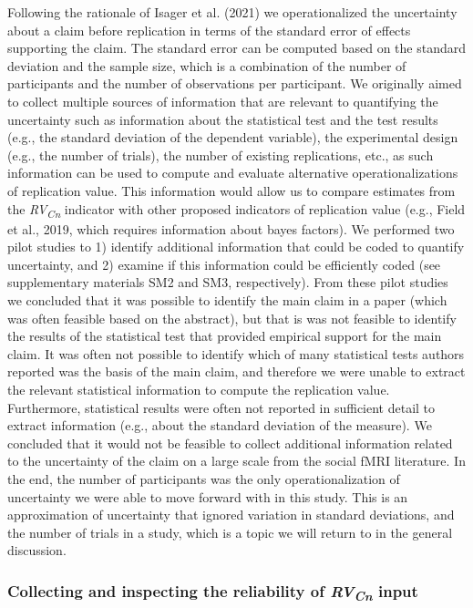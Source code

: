 \documentclass[
  man,floatsintext]{apa6}
\begin{document}
Following the rationale of Isager et al. (2021) we operationalized the uncertainty about a claim before replication in terms of the standard error of effects supporting the claim. The standard error can be computed based on the standard deviation and the sample size, which is a combination of the number of participants and the number of observations per participant. We originally aimed to collect multiple sources of information that are relevant to quantifying the uncertainty such as information about the statistical test and the test results (e.g., the standard deviation of the dependent variable), the experimental design (e.g., the number of trials), the number of existing replications, etc., as such information can be used to compute and evaluate alternative operationalizations of replication value. This information would allow us to compare estimates from the \emph{RV\textsubscript{Cn}} indicator with other proposed indicators of replication value (e.g., Field et al., 2019, which requires information about bayes factors). We performed two pilot studies to 1) identify additional information that could be coded to quantify uncertainty, and 2) examine if this information could be efficiently coded (see supplementary materials SM2 and SM3, respectively). From these pilot studies we concluded that it was possible to identify the main claim in a paper (which was often feasible based on the abstract), but that is was not feasible to identify the results of the statistical test that provided empirical support for the main claim. It was often not possible to identify which of many statistical tests authors reported was the basis of the main claim, and therefore we were unable to extract the relevant statistical information to compute the replication value. Furthermore, statistical results were often not reported in sufficient detail to extract information (e.g., about the standard deviation of the measure). We concluded that it would not be feasible to collect additional information related to the uncertainty of the claim on a large scale from the social fMRI literature. In the end, the number of participants was the only operationalization of uncertainty we were able to move forward with in this study. This is an approximation of uncertainty that ignored variation in standard deviations, and the number of trials in a study, which is a topic we will return to in the general discussion.

\hypertarget{collecting-and-inspecting-the-reliability-of-rvcn-input}{%
\subsubsection{\texorpdfstring{Collecting and inspecting the reliability of \emph{RV\textsubscript{Cn}} input}{Collecting and inspecting the reliability of RVCn input}}\label{collecting-and-inspecting-the-reliability-of-rvcn-input}}
\end{document}
